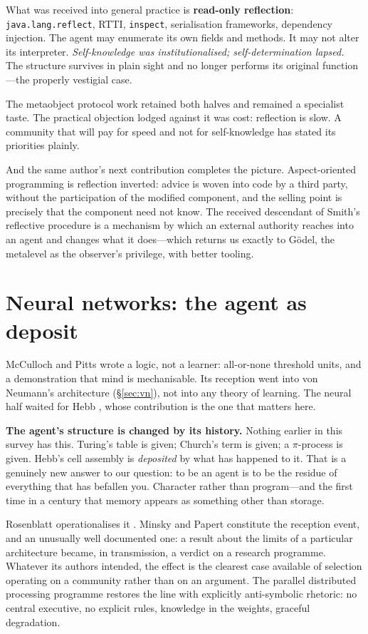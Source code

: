 \documentclass[11pt,a4paper]{article}
\begin{document}
What was received into general practice is \textbf{read-only reflection}:
\texttt{java.lang.reflect}, RTTI, \texttt{inspect}, serialisation frameworks,
dependency injection. The agent may enumerate its own fields and methods. It may
not alter its interpreter. \emph{Self-knowledge was institutionalised;
self-determination lapsed.} The structure survives in plain sight and no longer
performs its original function---the properly vestigial case.

The metaobject protocol work \cite{kiczales1991} retained both halves and remained
a specialist taste. The practical objection lodged against it was cost: reflection
is slow. A community that will pay for speed and not for self-knowledge has stated
its priorities plainly.

And the same author's next contribution completes the picture. Aspect-oriented
programming \cite{kiczales1997} is reflection inverted: advice is woven into code
by a third party, without the participation of the modified component, and the
selling point is precisely that the component need not know. The received
descendant of Smith's reflective procedure is a mechanism by which an external
authority reaches into an agent and changes what it does---which returns us
exactly to G\"odel, the metalevel as the observer's privilege, with better
tooling.

\section{Neural networks: the agent as deposit}
\label{sec:nn}

McCulloch and Pitts \cite{mcculloch1943} wrote a logic, not a learner:
all-or-none threshold units, and a demonstration that mind is mechanisable. Its
reception went into von Neumann's architecture (\S\ref{sec:vn}), not into any
theory of learning. The neural half waited for Hebb \cite{hebb1949}, whose
contribution is the one that matters here.

\textbf{The agent's structure is changed by its history.} Nothing earlier in this
survey has this. Turing's table is given; Church's term is given; a
$\pi$-process is given. Hebb's cell assembly is \emph{deposited} by what has
happened to it. That is a genuinely new answer to our question: to be an agent is
to be the residue of everything that has befallen you. Character rather than
program---and the first time in a century that memory appears as something other
than storage.

Rosenblatt operationalises it \cite{rosenblatt1958}. Minsky and Papert
\cite{minsky1969} constitute the reception event, and an unusually well
documented one: a result about the limits of a particular architecture became, in
transmission, a verdict on a research programme. Whatever its authors intended,
the effect is the clearest case available of selection operating on a community
rather than on an argument. The parallel distributed processing programme
restores the line \cite{rumelhart1986,pdp1986} with explicitly anti-symbolic
rhetoric: no central executive, no explicit rules, knowledge in the weights,
graceful degradation.
\end{document}
